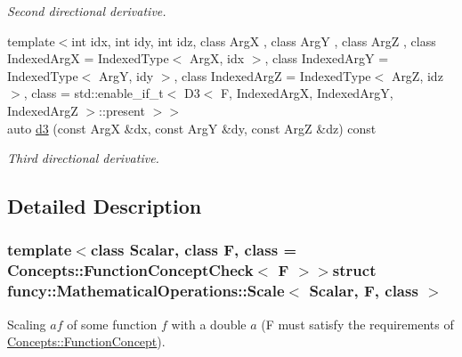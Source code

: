\begin{DoxyCompactItemize}
\begin{DoxyCompactList}\small\item\em Second directional derivative. \end{DoxyCompactList}\item 
{\footnotesize template$<$int idx, int idy, int idz, class Arg\-X , class Arg\-Y , class Arg\-Z , class Indexed\-Arg\-X  = Indexed\-Type$<$ Arg\-X, idx $>$, class Indexed\-Arg\-Y  = Indexed\-Type$<$ Arg\-Y, idy $>$, class Indexed\-Arg\-Z  = Indexed\-Type$<$ Arg\-Z, idz $>$, class  = std\-::enable\-\_\-if\-\_\-t$<$                           D3$<$ F, Indexed\-Arg\-X, Indexed\-Arg\-Y, Indexed\-Arg\-Z $>$\-::present $>$$>$ }\\auto \hyperlink{structfuncy_1_1MathematicalOperations_1_1Scale_a2ddf7d04bf049c13bec514fcb7016626}{d3} (const Arg\-X \&dx, const Arg\-Y \&dy, const Arg\-Z \&dz) const 
\begin{DoxyCompactList}\small\item\em Third directional derivative. \end{DoxyCompactList}\end{DoxyCompactItemize}


\subsection{Detailed Description}
\subsubsection*{template$<$class Scalar, class F, class = Concepts\-::\-Function\-Concept\-Check$<$ F $>$$>$struct funcy\-::\-Mathematical\-Operations\-::\-Scale$<$ Scalar, F, class $>$}

Scaling $ af $ of some function $ f $ with a double $ a $ (F must satisfy the requirements of \hyperlink{structfuncy_1_1Concepts_1_1FunctionConcept}{Concepts\-::\-Function\-Concept}). 

